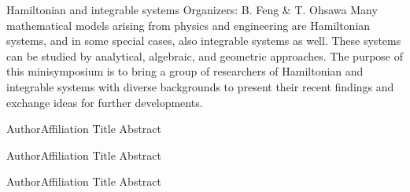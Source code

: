 \label{mini11}

\miniabs
{Hamiltonian and integrable systems}
{Organizers: B. Feng \& T. Ohsawa}
{Many mathematical models arising from physics and engineering are Hamiltonian systems, and in some special cases, also integrable systems as well. These systems can be studied by analytical, algebraic, and geometric approaches. The purpose of this minisymposium is to bring a group of researchers of Hamiltonian and integrable systems with diverse backgrounds to present their recent findings and exchange ideas for further developments.}
\vspace{2ex}



\abs
{Author}{Affiliation}
{Title}
{Abstract
}

\vspace{1.5ex}

\abs
{Author}{Affiliation}
{Title}
{Abstract
}

\vspace{1.5ex}

\abs
{Author}{Affiliation}
{Title}
{Abstract
}
